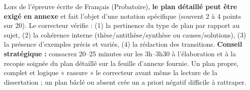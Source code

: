 \documentclass[11pt]{article}
\begin{document}
\begin{savaistu}
Lors de l'épreuve écrite de Français (Probatoire), \textbf{le plan détaillé peut être exigé en annexe} et fait l'objet d'une notation spécifique (souvent 2 à 4 points sur 20). Le correcteur vérifie : (1) la pertinence du type de plan par rapport au sujet, (2) la cohérence interne (thèse/antithèse/synthèse ou causes/solutions), (3) la présence d'exemples précis et variés, (4) la rédaction des transitions. \textbf{Conseil stratégique :} consacrez 20--25 minutes sur les 3h--3h30 à l'élaboration et à la recopie soignée du plan détaillé sur la feuille d'annexe fournie. Un plan propre, complet et logique « rassure » le correcteur avant même la lecture de la dissertation ; un plan bâclé ou absent crée un a priori négatif difficile à rattraper.
\end{savaistu}
\end{document}
